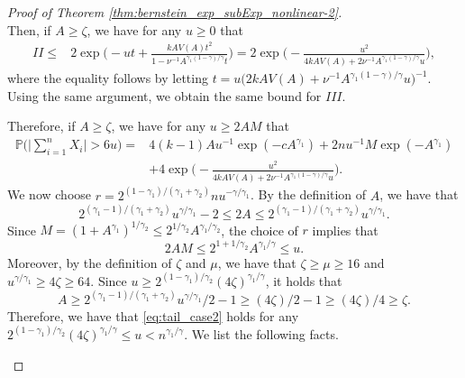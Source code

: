 \documentclass[11pt]{article}
\theoremstyle{plain}
\theoremstyle{definition}
\begin{document}
\begin{proof}[Proof of Theorem \ref{thm:bernstein_exp_subExp_nonlinear-2}]
\begin{equation*}
\end{equation*}
Then, if $A \geq \zeta$, we have for any $u \geq 0$ that
\begin{equation*}
\begin{aligned}
    II \leq& 2\exp\Big( -ut + \frac{kAV(A)t^2}{1-\nu^{-1}A^{\gamma_1(1-\gamma)/\gamma}t} \Big) = 2\exp\Big( -\frac{u^2}{4kAV(A) + 2\nu^{-1}A^{\gamma_1(1-\gamma)/\gamma}u} \Big),
\end{aligned}
\end{equation*}
where the equality follows by letting $t = u\big(2kAV(A) + \nu^{-1}A^{\gamma_1(1-\gamma)/\gamma}u\big)^{-1}$. Using the same argument, we obtain the same bound for $III$.

Therefore, if $A \geq \zeta$, we have for any $u \geq 2AM$ that
\begin{equation}\label{eq:tail_case2}
\begin{aligned}
    \mathbb{P}\Big( \Big|\sum_{i = 1}^nX_i\Big| > 6u \Big) =& 4(k-1)Au^{-1}\exp(-cA^{\gamma_1}) + 2nu^{-1}M\exp(-A^{\gamma_1})\\
    &+ 4\exp\Big( -\frac{u^2}{4kAV(A) + 2\nu^{-1}A^{\gamma_1(1-\gamma)/\gamma}u} \Big).
\end{aligned}
\end{equation}
We now choose $r = 2^{(1-\gamma_1)/(\gamma_1+\gamma_2)}nu^{-\gamma/\gamma_1}$. By the definition of $A$, we have that 
\begin{equation*}
    2^{(\gamma_1-1)/(\gamma_1+\gamma_2)}u^{\gamma/\gamma_1} - 2 \leq 2A \leq 2^{(\gamma_1-1)/(\gamma_1+\gamma_2)}u^{\gamma/\gamma_1}.
\end{equation*}
Since $M = (1+A^{\gamma_1})^{1/\gamma_2} \leq 2^{1/\gamma_2}A^{\gamma_1/\gamma_2}$, the choice of $r$ implies that 
\begin{equation*}
    2AM \leq 2^{1+1/\gamma_2}A^{\gamma_1/\gamma} \leq u.
\end{equation*}
Moreover, by the definition of $\zeta$ and $\mu$, we have that $\zeta \geq \mu \geq 16$ and $u^{\gamma/\gamma_1} \geq 4\zeta \geq 64$. Since $u \geq 2^{(1-\gamma_1)/\gamma_2}(4\zeta)^{\gamma_1/\gamma}$, it holds that 
\begin{equation*}
    A \geq 2^{(\gamma_1-1)/(\gamma_1+\gamma_2)}u^{\gamma/\gamma_1}/2 - 1 \geq (4\zeta)/2-1 \geq (4\zeta)/4 \geq \zeta.
\end{equation*}
Therefore, we have that \eqref{eq:tail_case2} holds for any $2^{(1-\gamma_1)/\gamma_2}(4\zeta)^{\gamma_1/\gamma} \leq u < n^{\gamma_1/\gamma}$. We list the following facts.
\begin{itemize}

\end{itemize}
\end{proof}
\end{document}
